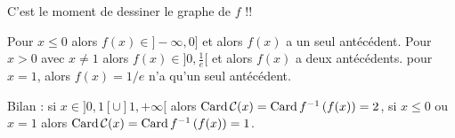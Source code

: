 {{C'est le moment de dessiner le graphe de $f$ !!

   \begin{itemize}
Pour $x\leqslant 0$ alors $f(x) \in ]-\infty,0]$ et alors $f(x)$ a un seul ant\'ec\'edent.
Pour $x>0$ avec $x\neq 1$ alors $f(x) \in ]0,\frac 1e[$ et alors $f(x)$ a deux ant\'ec\'edents.
pour $x=1$, alors $f(x) = 1/e$ n'a qu'un seul antécédent.
   \end{itemize}
   
   Bilan : si $x \in {}]0,1[ \cup ]1,+\infty[$ alors $\text{Card\,} \mathcal{C}(x) = \text{Card\,} f^{-1}\left( f(x) \right) = 2$,
   si $x\leqslant 0$ ou $x=1$ alors $\text{Card\,} \mathcal{C}(x) = \text{Card\,} f^{-1}\left( f(x) \right) = 1$.
}
}
